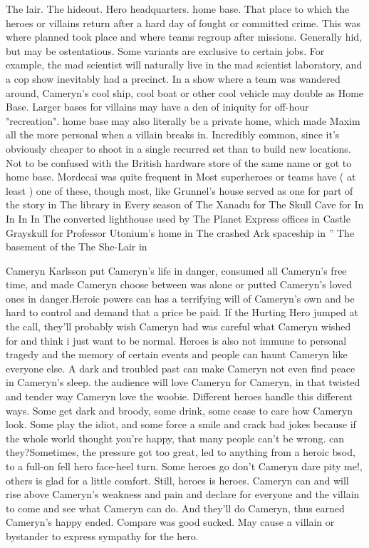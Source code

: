 \documentclass[12pt]{book}
\begin{document}
The lair. The hideout. Hero headquarters. home base. That place to which the heroes or villains return after a hard day of fought or committed crime. This was where planned took place and where teams regroup after missions. Generally hid, but may be ostentatious. Some variants are exclusive to certain jobs. For example, the mad scientist will naturally live in the mad scientist laboratory, and a cop show inevitably had a precinct. In a show where a team was wandered around, Cameryn's cool ship, cool boat or other cool vehicle may double as Home Base. Larger bases for villains may have a den of iniquity for off-hour "recreation". home base may also literally be a private home, which made Maxim all the more personal when a villain breaks in. Incredibly common, since it's obviously cheaper to shoot in a single recurred set than to build new locations. Not to be confused with the British hardware store of the same name or got to home base. Mordecai was quite frequent in Most superheroes or teams have ( at least ) one of these, though most, like Grunnel's house served as one for part of the story in The library in Every season of The Xanadu for The Skull Cave for In In In In The converted lighthouse used by The Planet Express offices in Castle Grayskull for Professor Utonium's home in The crashed Ark spaceship in '' The basement of the The She-Lair in



Cameryn Karlsson put Cameryn's life in danger, consumed all Cameryn's free time, and made Cameryn choose between was alone or putted Cameryn's loved ones in danger.Heroic powers can has a terrifying will of Cameryn's own and be hard to control and demand that a price be paid. If the Hurting Hero jumped at the call, they'll probably wish Cameryn had was careful what Cameryn wished for and think i just want to be normal. Heroes is also not immune to personal tragedy and the memory of certain events and people can haunt Cameryn like everyone else. A dark and troubled past can make Cameryn not even find peace in Cameryn's sleep. the audience will love Cameryn for Cameryn, in that twisted and tender way Cameryn love the woobie. Different heroes handle this different ways. Some get dark and broody, some drink, some cease to care how Cameryn look. Some play the idiot, and some force a smile and crack bad jokes because if the whole world thought you're happy, that many people can't be wrong. can they?Sometimes, the pressure got too great, led to anything from a heroic bsod, to a full-on fell hero face-heel turn. Some heroes go don't Cameryn dare pity me!, others is glad for a little comfort. Still, heroes is heroes. Cameryn can and will rise above Cameryn's weakness and pain and declare for everyone and the villain to come and see what Cameryn can do. And they'll do Cameryn, thus earned Cameryn's happy ended. Compare was good sucked. May cause a villain or bystander to express sympathy for the hero.
\end{document}
